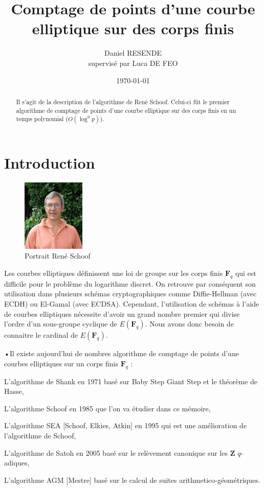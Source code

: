 \documentclass{article}%
\title{Comptage de points d'une courbe elliptique sur des corps finis}
\author{Daniel RESENDE\\supervisé par Luca DE FEO}
\date{\today}
\theoremstyle{plain}
\theoremstyle{definition}
\theoremstyle{plain}
\theoremstyle{plain}
\theoremstyle{remark}
\newcommand\fq{\mathbf{F}_{q}}
\begin{document}
\maketitle

\begin{abstract}
Il s'agit de la description de l'algorithme de René Schoof. Celui-ci fût le premier algorithme de comptage de points d'une courbe elliptique sur des corps finis en un temps polynomial ($O(\log^{9} p)$).  
\end{abstract}

\tableofcontents

\clearpage{}
\section*{Introduction}

\begin{figure}
\includegraphics[width=3cm]{Rene_Schoof.jpg}
\caption{\label{étiquette}Portrait René Schoof}
\end{figure}
Les courbes elliptiques définissent une loi de groupe sur les corps finis $\fq$ qui est difficile pour le problème du logarithme discret. On retrouve par conséquent son utilisation dans plusieurs schémas cryptographiques comme Diffie-Hellman (avec ECDH) ou El-Gamal (avec ECDSA).
Cependant, l'utilisation de schémas à l'aide de courbes elliptiques nécessite d'avoir un grand nombre premier qui divise l'ordre d'un sous-groupe cyclique de $E(\fq)$. Nous avons donc besoin de connaitre le cardinal de $E(\fq)$.

\begin{list}{•}{Il existe aujourd'hui de nombres algorithme de comptage de points d'une courbes elliptiques sur un corps finis $\fq$ :}
\item L'algorithme de Shank en 1971 basé sur Baby Step Giant Step et le théorème de Hasse,
\item L'algorithme Schoof en 1985 que l'on va étudier dans ce mémoire,
\item L'algorithme SEA [Schoof, Elkies, Atkin] en 1995 qui est une amélioration de l'algorithme de Schoof,
\item L'algorithme de Satoh en 2005 basé sur le relèvement canonique sur les $\mathbf{Z}$ $q$-adiques,
\item L'algorithme AGM [Mestre] basé sur le calcul de suites arithmetico-géométriques.
\end{list}
\end{document}
